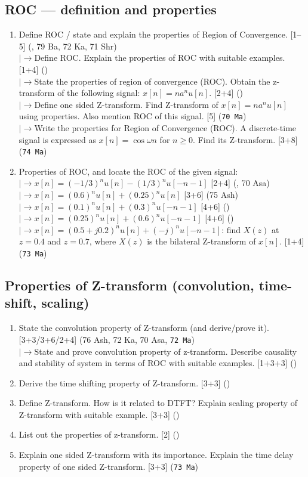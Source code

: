 \documentclass[12pt]{article}
\newcommand{\lb}{\\$\left|\rightarrow\right.$}
\begin{document}
  \subsection{ROC --- definition and properties}
    \begin{enumerate}[topsep=0pt, noitemsep]
      \item Define ROC / state and explain the properties of Region of Convergence. \hfill [1--5] (, 79 Ba, 72 Ka, 71 Shr)
        \lb Define ROC. Explain the properties of ROC with suitable examples. \hfill [1+4] ()
        \lb State the properties of region of convergence (ROC). Obtain the z-transform of the following signal: $x[n]=na^n u[n]$. \hfill [2+4] ()
        \lb Define one sided Z-transform. Find Z-transform of $x[n]=na^n u[n]$ using properties. Also mention ROC of this signal. \hfill [5] (\texttt{70 Ma})
        \lb Write the properties for Region of Convergence (ROC). A discrete-time signal is expressed as $x[n]=\cos\omega n$ for $n\ge0$. Find its Z-transform. \hfill [3+8] (\texttt{74 Ma})

      \item Properties of ROC, and locate the ROC of the given signal:
        \lb $x[n]=(-1/3)^n u[n]-(1/3)^n u[-n-1]$ \hfill [2+4] (, 70 Asa)
        \lb $x[n]=(0.6)^n u[n]+(0.25)^n u[n]$ \hfill [3+6] (75 Ash)
        \lb $x[n]=(0.1)^n u[n]+(0.3)^n u[-n-1]$ \hfill [4+6] ()
        \lb $x[n]=(0.25)^n u[n]+(0.6)^n u[-n-1]$ \hfill [4+6] ()
        \lb $x[n]=(0.5+j0.2)^n u[n]+(-j)^n u[-n-1]$: find $X(z)$ at $z=0.4$ and $z=0.7$, where $X(z)$ is the bilateral Z-transform of $x[n]$. \hfill [1+4] (\texttt{73 Ma})
    \end{enumerate}

  \subsection{Properties of Z-transform (convolution, time-shift, scaling)}
    \begin{enumerate}[topsep=0pt, noitemsep]
      \item State the convolution property of Z-transform (and derive/prove it). \hfill [3+3/3+6/2+4] (76 Ash, 72 Ka, 70 Asa, \texttt{72 Ma})
        \lb State and prove convolution property of z-transform. Describe causality and stability of system in terms of ROC with suitable examples. \hfill [1+3+3] ()
      \item Derive the time shifting property of Z-transform. \hfill [3+3] ()
      \item Define Z-transform. How is it related to DTFT? Explain scaling property of Z-transform with suitable example. \hfill [3+3] ()
      \item List out the properties of z-transform. \hfill [2] ()
      \item Explain one sided Z-transform with its importance. Explain the time delay property of one sided Z-transform. \hfill [3+3] (\texttt{73 Ma})
    \end{enumerate}
\end{document}
